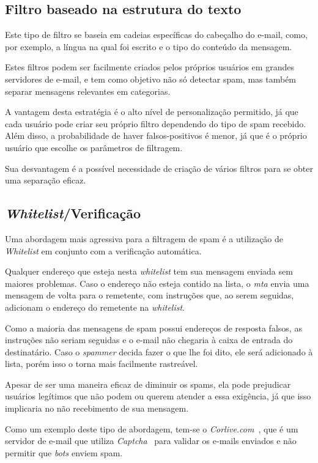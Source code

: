 \documentclass[a4paper,dvipdfm]{article}
\begin{document}
	\subsection{Filtro baseado na estrutura do texto}
		Este tipo de filtro se baseia em cadeias específicas do cabeçalho do e-mail, como, por exemplo, a língua na qual foi escrito e o tipo do conteúdo da mensagem.

		Estes filtros podem ser facilmente criados pelos próprios usuários em grandes servidores de e-mail, e tem como objetivo não só detectar spam, mas também separar mensagens relevantes em categorias.

		A vantagem desta estratégia é o alto nível de personalização permitido, já que cada usuário pode criar seu próprio filtro dependendo do tipo de spam recebido. 
		Além disso, a probabilidade de haver falsos-positivos é menor, já que é o próprio usuário que escolhe os parâmetros de filtragem.
		
		Sua desvantagem é a possível necessidade de criação de vários filtros para se obter uma separação eficaz.


	\subsection{\emph{Whitelist}/Verificação}
		Uma abordagem mais agressiva para a filtragem de spam é a utilização de \emph{Whitelist} em conjunto com a verificação automática.

		Qualquer endereço que esteja nesta \emph{whitelist} tem sua mensagem enviada sem maiores problemas.
		Caso o endereço não esteja contido na lista, o \emph{\gls{mta}} envia uma mensagem de volta para o remetente, com instruções que, ao serem seguidas, adicionam o endereço do remetente na \emph{whitelist}.

		Como a maioria das mensagens de spam possui endereços de resposta falsos, as instruções não seriam seguidas e o e-mail não chegaria à caixa de entrada do destinatário.
		Caso o \emph{spammer} decida fazer o que lhe foi dito, ele será adicionado à lista, porém isso o torna mais facilmente rastreável.
		
		Apesar de ser uma maneira eficaz de diminuir os spams, ela pode prejudicar usuários legítimos que não podem ou querem atender a essa exigência, já que isso implicaria no não recebimento de sua mensagem.

		Como um exemplo deste tipo de abordagem, tem-se o \emph{Corlive.com}~\cite{corlive}, que é um servidor de e-mail que utiliza \emph{Captcha}~\cite{captcha} para validar os e-mails enviados e não permitir que \emph{bots} enviem spam.
\end{document}
